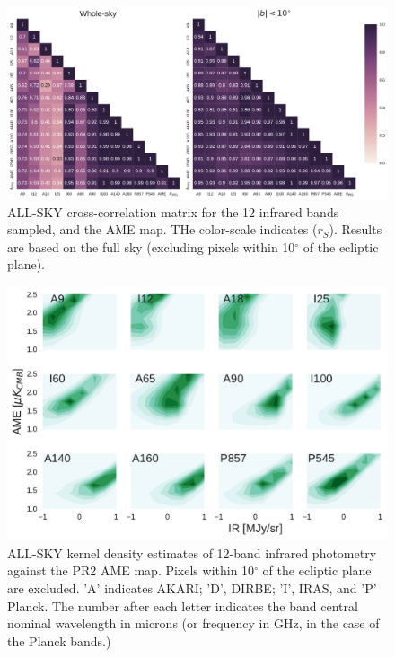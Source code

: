       \begin{figure}

        \includegraphics[width=\textwidth]{../Plots/all_bands_corr_matrix_wAME_spearman.pdf}
        \centering
        \caption{ALL-SKY cross-correlation matrix for the 12 infrared bands sampled, and the AME map. THe color-scale indicates ($r_{S}$). Results are based on the full sky (excluding pixels within 10$^{\circ}$ of the ecliptic plane).}
        \label{fig:AME_IR_crosscorr_allbandsg}
      \end{figure}

      \begin{figure}

        \includegraphics[width=\textwidth]{../Plots/AMEvsDust_allsky_allbands.pdf}
        \centering
        \caption{ALL-SKY kernel density estimates of 12-band infrared photometry against the PR2 AME map. Pixels within 10$^{\circ}$ of the ecliptic plane are excluded. 'A' indicates AKARI; 'D', DIRBE; 'I', IRAS, and 'P' Planck. The number after each letter indicates the band central nominal wavelength in microns (or frequency in GHz, in the case of the Planck bands.) }
        \label{fig:AMEvsDust_allsky_allbands}
      \end{figure}

